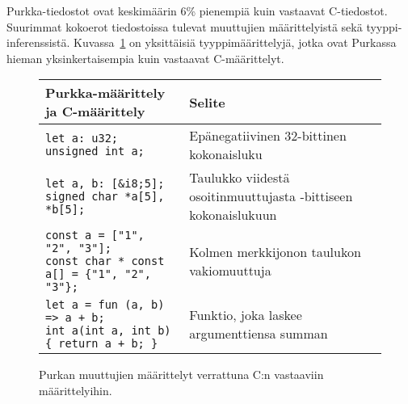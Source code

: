 Purkka-tiedostot ovat keskimäärin 6\% pienempiä kuin vastaavat C-tiedostot.
Suurimmat kokoerot tiedostoissa tulevat muuttujien määrittelyistä sekä
tyyppi\hyp{}inferenssistä. Kuvassa~\ref{fig:declarations} on yksittäisiä
tyyppimäärittelyjä, jotka ovat Purkassa hieman yksinkertaisempia kuin vastaavat
C-määrittelyt.

\begin{figure}[ht!]
    \begin{adjustbox}{center}
        \begin{tabular}{@{} m{} m{} @{}} \toprule
            Purkka-määrittely ja C-määrittely & Selite \\ \midrule

            \texttt{let a: u32; \newline unsigned int a;} & Epänegatiivinen 32-bittinen kokonaisluku \\
            \noalign{\vspace{0.3cm}}

            \texttt{let a, b: [\&i8;5]; \newline signed char *a[5], *b[5];} & Taulukko viidestä osoitinmuuttujasta \newline 8-bittiseen kokonaislukuun \\
            \noalign{\vspace{0.3cm}}

            \texttt{const a = ["1", "2", "3"]; \newline const char * const a[] = \{"1", "2", "3"\};} & Kolmen merkkijonon taulukon vakiomuuttuja \\
            \noalign{\vspace{0.3cm}}

            \texttt{let a = fun (a, b) => a + b; \newline int a(int a, int b) \{ return a + b; \}} & Funktio, joka laskee argumenttiensa summan \\ \bottomrule
        \end{tabular}
    \end{adjustbox}
    \label{fig:declarations}
    \caption{Purkan muuttujien määrittelyt verrattuna C:n vastaaviin
    määrittelyihin.}
\end{figure}

